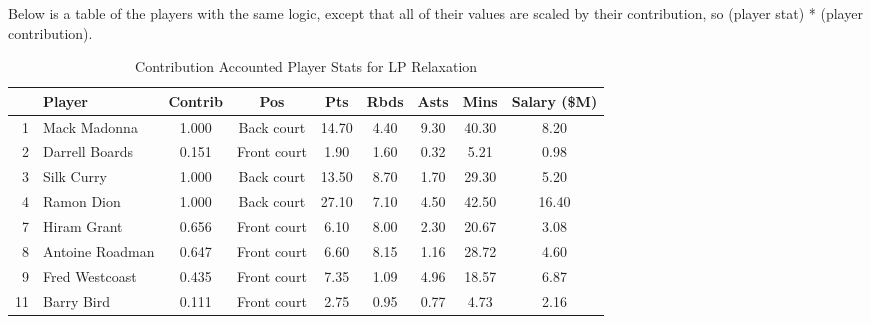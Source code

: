 \documentclass[a4paper,11pt]{article}
\begin{document}
Below is a table of the players with the same logic, except that all of their values are scaled by their contribution, so (player stat) * (player contribution).

\begin{table}[h!]
    \centering
    \begin{tabular}{rlccccccc}
        \hline
        & \textbf{Player} & \textbf{Contrib} & \textbf{Pos} & \textbf{Pts} & \textbf{Rbds} & \textbf{Asts} & \textbf{Mins} & \textbf{Salary (\$M)} \\
        \hline
        1  & Mack Madonna    & 1.000            & Back court   & 14.70        & 4.40          & 9.30          & 40.30         & 8.20                  \\
        2  & Darrell Boards  & 0.151            & Front court  & 1.90         & 1.60          & 0.32          & 5.21          & 0.98                  \\
        3  & Silk Curry      & 1.000            & Back court   & 13.50        & 8.70          & 1.70          & 29.30         & 5.20                  \\
        4  & Ramon Dion      & 1.000            & Back court   & 27.10        & 7.10          & 4.50          & 42.50         & 16.40                 \\
        7  & Hiram Grant     & 0.656            & Front court  & 6.10         & 8.00          & 2.30          & 20.67         & 3.08                  \\
        8  & Antoine Roadman & 0.647            & Front court  & 6.60         & 8.15          & 1.16          & 28.72         & 4.60                  \\
        9  & Fred Westcoast  & 0.435            & Front court  & 7.35         & 1.09          & 4.96          & 18.57         & 6.87                  \\
        11 & Barry Bird      & 0.111            & Front court  & 2.75         & 0.95          & 0.77          & 4.73          & 2.16                  \\
        \hline
    \end{tabular}
    \caption{Contribution Accounted Player Stats for LP Relaxation}
    \label{tab:player_contributions_LP}
\end{table}
\end{document}
